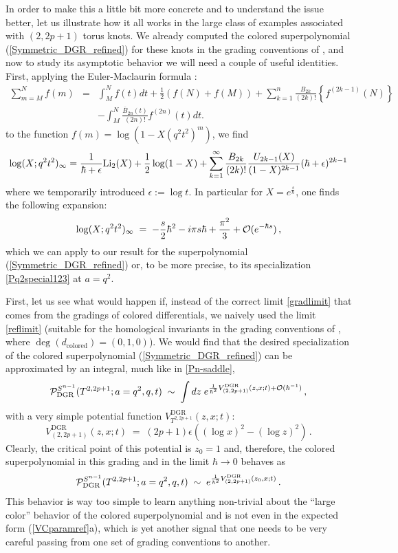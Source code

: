 \documentclass[hyper,letterpaper]{JHEP3}
\newcommand{\be}{\begin{equation}}
\newcommand{\ee}{\end{equation}}
\renewcommand{\P}{{\cal P}}
\renewcommand{\bar}{\overline}
\begin{document}
In order to make this a little bit more concrete and to understand the issue better,
let us illustrate how it all works in the large class of examples associated with $(2,2p+1)$ torus knots.
We already computed the colored superpolynomial (\ref{Symmetric_DGR_refined}) for these knots
in the grading conventions of \cite{DGR}, and now to study its asymptotic behavior we will need
a couple of useful identities.
First, applying the Euler-Maclaurin formula \cite{Kirillov}:
\begin{eqnarray}
\sum_{m=M}^Nf(m)&=&\int_M^Nf(t)dt+\frac{1}{2}(f(N)+f(M))
+\sum_{k=1}^{n}\frac{B_{2k}}{(2k)!}\left\{
f^{(2k-1)}(N)
\right\}
\nonumber \\
&&-\int_M^N\frac{\bar{B}_{2n}(t)}{(2n)!}f^{(2n)}(t)dt.
\end{eqnarray}
to the function $f(m)=\log\left(1-X(q^2t^2)^m\right)$, we find
\begin{eqnarray}
\log(X;q^2t^2)_{\infty}=
\frac{1}{\hbar+\epsilon}{\rm Li}_2(X)+\frac{1}{2}\log(1-X)+\sum_{k=1}^{\infty}
\frac{B_{2k}}{(2k)!}\frac{U_{2k-1}(X)}{(1-X)^{2k-1}}(\hbar+\epsilon)^{2k-1}
\end{eqnarray}
where we temporarily introduced $\epsilon:=\log t$.
In particular for $X=e^{\frac{s}{\hbar}}$, one finds the following expansion:
\begin{eqnarray}
\log(X;q^2t^2)_{\infty} \; = \; -\frac{s}{2}\hbar^2-i\pi s\hbar+\frac{\pi^2}{3} +{\cal O}(e^{-\hbar s}) \,,
\end{eqnarray}
which we can apply to our result for the superpolynomial (\ref{Symmetric_DGR_refined})
or, to be more precise, to its specialization \eqref{Pq2special123} at $a = q^2$.

First, let us see what would happen if, instead of the correct limit \eqref{gradlimit} that comes from
the gradings of colored differentials, we naively used the limit \eqref{reflimit}
(suitable for the homological invariants in the grading conventions of \cite{GS}, where $\deg (d_{\text{colored}}) = (0,1,0)$).
We would find that the desired specialization of the colored superpolynomial (\ref{Symmetric_DGR_refined})
can be approximated by an integral, much like in \eqref{Pn-saddle},
\be
{\cal P}^{S^{n-1}}_{\text{DGR}}(T^{2,2p+1};a=q^2,q,t)
\; \sim \; \int dz\; e^{\frac{1}{\hbar^2}V_{(2,2p+1)}^{\text{DGR}}(z,x;t)+{\cal O}(\hbar^{-1})} \,,
\ee
with a very simple potential function $V_{T^{2,2p+1}}^{\text{DGR}} (z,x;t)$:
\be
V_{(2,2p+1)}^{\text{DGR}}(z,x;t)
\; = \; (2p+1)\epsilon\left((\log x)^2-(\log z)^2\right) \,.
\ee
Clearly, the critical point of this potential is $z_0 = 1$
and, therefore, the colored superpolynomial in this grading and in the limit $\hbar\to 0$ behaves as
\begin{eqnarray}
\P^{S^{n-1}}_{\text{DGR}}(T^{2,2p+1};a=q^2,q,t) \; \sim \; e^{\frac{1}{\hbar^2}V_{(2,2p+1)}^{\text{DGR}}(z_0,x;t)} \,.
\end{eqnarray}
This behavior is way too simple to learn anything non-trivial about the ``large color''
behavior of the colored superpolynomial and is not even in the expected form (\ref{VCparamref}a),
which is yet another signal that one needs to be very careful passing from one set of grading conventions to another.
\end{document}
